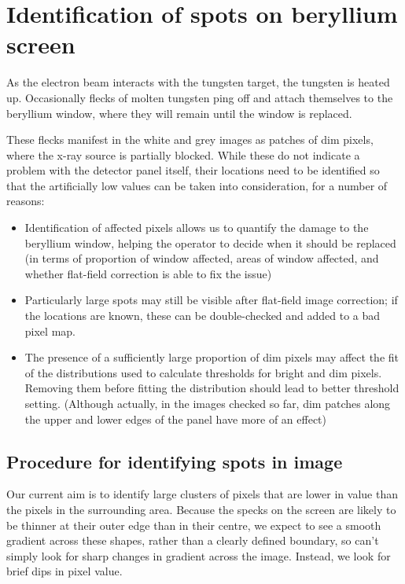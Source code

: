 \documentclass[10pt,fleqn]{article}
\begin{document}
\section*{Identification of spots on beryllium screen}

As the electron beam interacts with the tungsten target, the tungsten is heated up. Occasionally flecks of molten tungsten ping off and attach themselves to the beryllium window, where they will remain until the window is replaced.

These flecks manifest in the white and grey images as patches of dim pixels, where the x-ray source is partially blocked. While these do not indicate a problem with the detector panel itself, their locations need to be identified so that the artificially low values can be taken into consideration, for a number of reasons:

\begin{itemize}
\item Identification of affected pixels allows us to quantify the damage to the beryllium window, helping the operator to decide when it should be replaced (in terms of proportion of window affected, areas of window affected, and whether flat-field correction is able to fix the issue)

\item Particularly large spots may still be visible after flat-field image correction; if the locations are known, these can be double-checked and added to a bad pixel map.

\item The presence of a sufficiently large proportion of dim pixels may affect the fit of the distributions used to calculate thresholds for bright and dim pixels. Removing them before fitting the distribution should lead to better threshold setting. (Although actually, in the images checked so far, dim patches along the upper and lower edges of the panel have more of an effect)
\end{itemize}


\FloatBarrier
\subsection*{Procedure for identifying spots in image}
Our current aim is to identify large clusters of pixels that are lower in value than the pixels in the surrounding area. Because the specks on the screen are likely to be thinner at their outer edge than in their centre, we expect to see a smooth gradient across these shapes, rather than a clearly defined boundary, so can't simply look for sharp changes in gradient across the image. Instead, we look for brief dips in pixel value.
\end{document}
